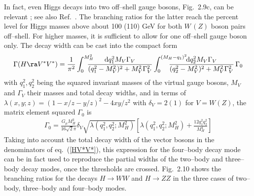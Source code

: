 In fact, even Higgs decays into two off--shell  gauge bosons, Fig.~2.9c, can be
relevant \cite{HVV-4body,HVV-4bodyAll}; see also Ref.~\cite{Eff-Romao}. The 
branching ratios for the latter reach the percent level for
Higgs masses above about 100 (110) GeV for both $W\, (Z)$ boson pairs 
off--shell. For higher masses, it is sufficient to allow for one off--shell 
gauge boson only. The decay width can be cast into the compact form 
\cite{HVV-4body}
\begin{eqnarray} 
\Gamma(H \ra V^*V^*) = \frac{1}{\pi^2}\int_0^{M_{H}^2} \hspace*{-0.4cm}  
\frac{{\rm d} q_1^2 M_V \Gamma_V}{(q_1^2 - M_V^2)^2 + M_V^2 \Gamma_V^2} 
\int_0^{(M_{H}-q_1)^2} \hspace*{-1cm} \frac{{\rm d}q_2^2 M_V \Gamma_V} {(q_2^2  
- M_V^2)^2 + M_V^2 \Gamma_V^2} \, \Gamma_0 
\label{HV*V*}
\end{eqnarray} 
with $q_1^2, q_2^2$ being the squared invariant masses of the virtual gauge 
bosons, $M_V$ and $\Gamma_V$ their masses and total decay widths, and in terms 
of $\lambda(x,y;z)=(1-x/z-y/z)^2-4xy/z^2$ with $\delta_V =2(1)$ for $V=W(Z)$,
the  matrix element  squared $\Gamma_0$ is 
\begin{eqnarray} 
\Gamma_0 = \frac{G_\mu M_{H}^3}{16\sqrt{2}\pi} \delta_V 
\sqrt{\lambda(q_1^2,q_2^2;M_{H}^2)} \left[ \lambda(q_1^2,q_2^2;M_{H}^2) +
\frac{12 q_1^2q_2^2}{ M_{H}^4} \right]  
\end{eqnarray}
Taking into account the total decay width of the vector bosons in the
denominators of eq.~(\ref{HV*V*}), this expression for the four--body decay 
mode can be in fact used to reproduce the partial widths of the two--body 
and three--body decay modes, once the thresholds are crossed. Fig.~2.10 
shows the branching ratios for the decays $H \to WW$ and $H \to ZZ$ in the 
three cases of two--body,  three--body and four--body modes. \s

\begin{figure}[htbp]
\begin{center}
\vspace*{-2.7cm}
\hspace*{-3cm}
\end{center}
\vspace*{-14.6cm}
\end{figure}


